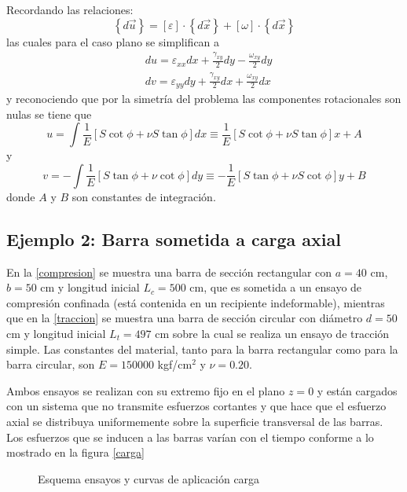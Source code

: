 \documentclass[../notas medios.tex]{subfiles}
\begin{document}
Recordando las relaciones:
\[\left\{ d\vec u \right\} = \left[ \varepsilon  \right] \cdot \left\{ d\vec x \right\} + \left[ \omega  \right] \cdot \left\{ d\vec x\right\}\]
las cuales para el caso plano se simplifican a
\begin{align*}
&du = \varepsilon_{xx}dx + \frac{\gamma_{xy}}{2}dy - \frac{\omega_{xy}}{2}dy\\
&dv = \varepsilon_{yy}dy + \frac{\gamma_{xy}}{2}dx + \frac{\omega_{xy}}{2}dx
\end{align*}
y reconociendo que por la simetría del problema las componentes rotacionales son nulas se tiene que
\[u = \int \frac{1}{E}[ S \cot\phi  + \nu S \tan\phi]dx  \equiv \frac{1}{E}[S \cot\phi  + \nu S \tan\phi]x + A\]
y
\[v =  - \int \frac{1}{E}[S \tan\phi  + \nu \cot\phi]dy  \equiv  - \frac{1}{E}[S \tan\phi  + \nu S \cot\phi]y + B\]
donde $A$ y $B$ son constantes de integración.


\subsection*{Ejemplo 2: Barra sometida a carga axial}

En la \cref{compresion} se muestra una barra de sección rectangular con $a= 40$ cm, $b = 50$ cm y longitud inicial $L_{c} = 500$ cm, que es  sometida a un ensayo de compresión confinada (está contenida en un recipiente indeformable), mientras que en la \cref{traccion}  se muestra una barra de sección circular con diámetro $d = 50$ cm y longitud inicial $L_{t} = 497$ cm sobre la cual se realiza  un ensayo de tracción simple. Las constantes del material, tanto para la barra rectangular como para la barra circular, son $E=150000$ kgf/cm$^2$ y $\nu=0.20$.

Ambos ensayos se realizan con su extremo fijo  en el plano $z = 0$ y están cargados con un sistema que no transmite esfuerzos cortantes y que hace que el esfuerzo axial se distribuya uniformemente sobre la superficie transversal de las barras. Los esfuerzos que se inducen a las barras varían con el tiempo conforme a lo mostrado en la figura \cref{carga}
\begin{figure}[H]
	\centering
	\hspace{0.5cm}
		\hspace{0.5cm}
	\caption{Esquema ensayos y curvas de aplicación carga}
	\label{ensayo}
\end{figure}
\end{document}
